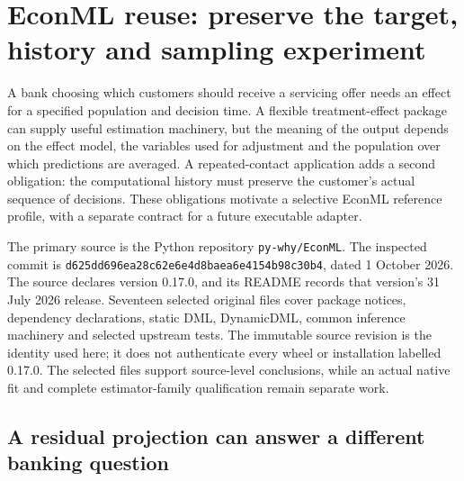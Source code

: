 \section{EconML reuse: preserve the target, history and sampling experiment}
\label{exec19:econml-scope}

A bank choosing which customers should receive a servicing offer needs an
effect for a specified population and decision time. A flexible treatment-effect
package can supply useful estimation machinery, but the meaning of the output
depends on the effect model, the variables used for adjustment and the population
over which predictions are averaged. A repeated-contact application adds a
second obligation: the computational history must preserve the customer's
actual sequence of decisions. These obligations motivate a selective EconML
reference profile, with a separate contract for a future executable adapter.

The primary source is the Python repository \texttt{py-why/EconML}.
The inspected commit is
\texttt{d625dd696ea28c62e6e4}\allowbreak\texttt{d8baea6e4154b98c30b4},
dated 1 October 2026. The source declares version 0.17.0, and its README records that version's
31 July 2026 release. Seventeen selected original files cover package notices,
dependency declarations, static DML, DynamicDML, common inference machinery
and selected upstream tests. The immutable source revision is the identity
used here; it does not authenticate every wheel or installation labelled
0.17.0. The selected files support source-level conclusions, while an actual
native fit and complete estimator-family qualification remain separate work.
\citep{exec19_econml_source}

\subsection{A residual projection can answer a different banking question}
\label{exec19:econml-target}

